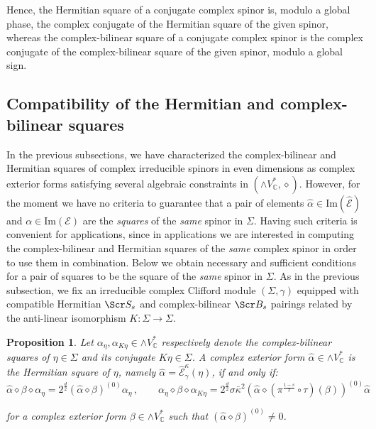 \documentclass[10pt,a4paper,twoside,reqno]{amsart}
\theoremstyle{plain}
\newtheorem{prop}[thm]{Proposition}
\theoremstyle{definition}
\theoremstyle{remark}
\def\C{\mathbb{C}}
\def\scB{\Scr B}
\def\scS{\Scr S}
\def\cE{\mathcal{E}}
\def\hcE{\widehat{\mathcal{E}}}
\def\Im{\mathrm{Im}}
\begin{document}
\noindent
Hence, the Hermitian square of a conjugate complex spinor is, modulo a global phase, the complex conjugate of the Hermitian square of the given spinor, whereas the complex-bilinear square of a conjugate complex spinor is the complex conjugate of the complex-bilinear square of the given spinor, modulo a global sign.


\subsection{Compatibility of the Hermitian and complex-bilinear squares}
\label{subsec:compatibilitysquares}


In the previous subsections, we have characterized the complex-bilinear and Hermitian squares of complex irreducible spinors in even dimensions as complex exterior forms satisfying several algebraic constraints in $(\wedge V^{\ast}_{\C},\diamond)$. However, for the moment we have no criteria to guarantee that a pair of elements $\widehat{\alpha} \in \Im(\hcE)$ and $\alpha \in \Im(\cE)$ are the \emph{squares} of the \emph{same} spinor in $\Sigma$. Having such criteria is convenient for applications, since in applications we are interested in computing the complex-bilinear and Hermitian squares of the \emph{same} complex spinor in order to use them in combination. Below we obtain necessary and sufficient conditions for a pair of squares to be the square of the \emph{same} spinor in $\Sigma$. As in the previous subsection, we fix an irreducible complex Clifford module $(\Sigma,\gamma)$ equipped with compatible Hermitian $\scS_s$ and complex-bilinear $\scB_s$ pairings related by the anti-linear isomorphism $K\colon \Sigma \to \Sigma$.

\begin{prop} 
\label{prop:compatibilitysquares}
Let $\alpha_{\eta} , \alpha_{K\eta} \in \wedge V^{\ast}_{\C}$ respectively denote the complex-bilinear squares of $\eta\in \Sigma$ and its conjugate $K\eta\in \Sigma$. A complex exterior form $\widehat{\alpha} \in \wedge V^{\ast}_{\C}$ is the Hermitian square of $\eta$, namely $\widehat{\alpha} = \hcE^\kappa_{\gamma}(\eta)$, if and only if:
\begin{equation*}  
\widehat{\alpha} \diamond \beta \diamond \alpha_{\eta}  = 2^{\frac{d}{2}} (\widehat{\alpha} \diamond \beta)^{(0)} \alpha_{\eta} \, , \qquad   \alpha_{\eta} \diamond \beta \diamond \alpha_{K\eta} = 2^{\frac{d}{2}} \sigma \bar{\kappa}^{2} (\widehat{\alpha} \diamond (\pi^{\frac{1-s}{2}}\circ \tau)(\beta))^{(0)} \widehat{\alpha}
\end{equation*}

\noindent
for a complex exterior form $\beta \in \wedge V^{\ast}_{\C}$ such that $(\widehat{\alpha} \diamond \beta)^{(0)} \neq 0$.
\end{prop}
\end{document}
